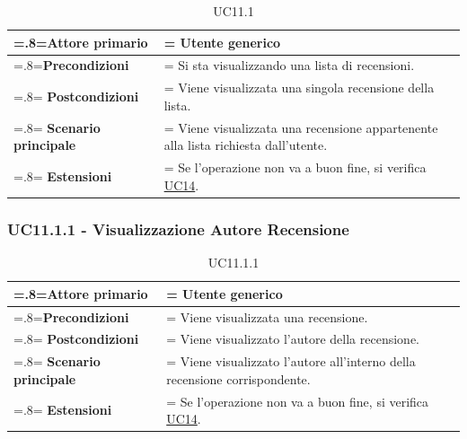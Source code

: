             \begin{table}[H]
                \centering
                \renewcommand{\arraystretch}{1.8}
                \renewcommand\tabularxcolumn[1]{m{#1}}
                \begin{tabularx}{0.9\textwidth} {
                    >{\hsize=.8\hsize\linewidth=\hsize}X
                    >{\hsize=1.2\hsize\linewidth=\hsize}X}
                    \hline
                    \textbf{Attore primario} & Utente generico \\
                    \hline
                    \textbf{Precondizioni} & Si sta visualizzando una lista di recensioni. \\
                    \hline
                    \textbf{Postcondizioni} & Viene visualizzata una singola recensione della lista. \\
                    \hline
                    \textbf{Scenario principale} & Viene visualizzata una recensione appartenente alla lista richiesta dall'utente. \\
                    \hline
                    \textbf{Estensioni} & Se l'operazione non va a buon fine, si verifica \hyperref[UC14]{UC14}. \\
                    \hline
                \end{tabularx}
                \caption{UC11.1}
            \end{table}

        \subsubsection{UC11.1.1 - Visualizzazione Autore Recensione}
        \label{UC11.1.1}

            \begin{table}[H]
                \centering
                \renewcommand{\arraystretch}{1.8}
                \renewcommand\tabularxcolumn[1]{m{#1}}
                \begin{tabularx}{0.9\textwidth} {
                    >{\hsize=.8\hsize\linewidth=\hsize}X
                    >{\hsize=1.2\hsize\linewidth=\hsize}X}
                    \hline
                    \textbf{Attore primario} & Utente generico \\
                    \hline
                    \textbf{Precondizioni} & Viene visualizzata una recensione. \\
                    \hline
                    \textbf{Postcondizioni} & Viene visualizzato l'autore della recensione. \\
                    \hline
                    \textbf{Scenario principale} & Viene visualizzato l'autore all'interno della recensione corrispondente. \\
                    \hline
                    \textbf{Estensioni} & Se l'operazione non va a buon fine, si verifica \hyperref[UC14]{UC14}. \\
                    \hline
                \end{tabularx}
                \caption{UC11.1.1}
            \end{table}

